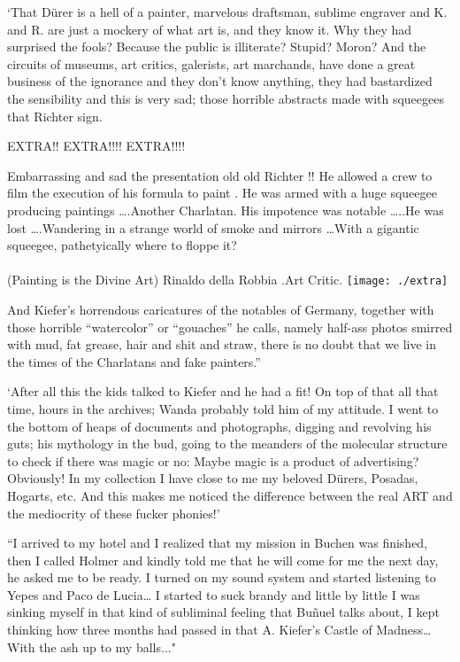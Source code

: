 \documentclass[smalldemyvopaper,11pt,twoside,onecolumn,openright,extrafontsizes]{memoir}
\begin{document}
‘That Dürer is a hell of a painter, marvelous draftsman, sublime engraver and K. and R. are just a mockery of what art is, and they know it. Why they had surprised the fools? Because the public is illiterate? Stupid? Moron? And the circuits of museums, art critics, galerists, art marchands, have done a great business of the ignorance and they don’t know anything, they had bastardized the sensibility and this is very sad; those horrible abstracts made with squeegees that Richter sign.

\ornamentbreak

EXTRA!!    EXTRA!!!!  EXTRA!!!!   

Embarrassing and sad the presentation old old Richter !! He allowed a crew to film the execution of his formula to paint . He was armed with a huge squeegee producing paintings ….Another Charlatan. His impotence was notable …..He was lost ….Wandering in a strange world of smoke and mirrors …With a gigantic squeegee, pathetyically where to floppe it?\\
\\(Painting is the Divine Art) Rinaldo della Robbia .Art Critic.
\texttt{[image: ./extra]}

\ornamentbreak

And Kiefer’s horrendous caricatures of the notables of Germany, together with those horrible “watercolor” or “gouaches” he calls, namely half-ass photos smirred with mud, fat grease, hair and shit and straw, there is no doubt that we live in the times of the Charlatans and fake painters.” 

‘After all this the kids talked to Kiefer and he had a fit! On top of that all that time, hours in the archives; Wanda probably told him of my attitude. I went to the bottom of heaps of documents and photographs, digging and revolving his guts; his mythology in the bud, going to the meanders of the molecular structure to check if there was magic or no: Maybe magic is a product of advertising? Obviously! In my collection I have close to me my beloved Dürers, Posadas, Hogarts, etc. And this makes me noticed the difference between the real ART and the mediocrity of these fucker phonies!’

\ornamentbreak

“I arrived to my hotel and I realized that my mission in Buchen was finished, then I called Holmer and kindly told me that he will come for me the next day, he asked me to be ready. I turned on my sound system and started listening to Yepes and Paco de Lucia… I started to suck brandy and little by little I was sinking myself in that kind of subliminal feeling that Buñuel talks about, I kept thinking how three months had passed in that A. Kiefer’s Castle of Madness…With the ash up to my balls..."
\end{document}
